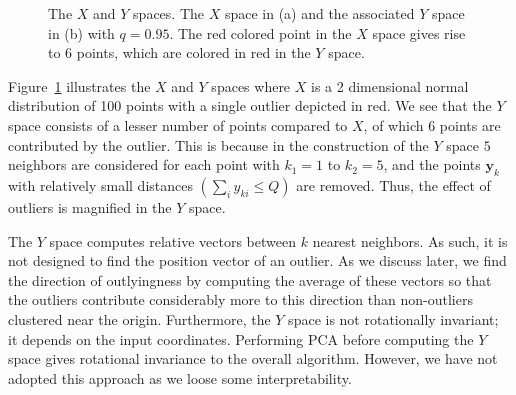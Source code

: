 \documentclass[letter,12pt]{article}
\begin{document}
\begin{figure}[!ht]
	\centering
	\hfill
	\caption{The $X$ and $Y$ spaces. The $X$ space in (a) and the associated $Y$ space in (b) with $q = 0.95$. The red colored point in the $X$ space gives rise to 6 points, which are colored in red in the $Y$ space.}
	\label{fig:XandY}
\end{figure}

Figure~\ref{fig:XandY} illustrates the $X$ and $Y$ spaces where $X$ is a 2 dimensional normal distribution of 100 points with a single outlier depicted in red.  We see that the $Y$ space consists of a lesser number of points compared to $X$, of which 6 points are contributed by the outlier. This is because in the construction of the $Y$ space $5$ neighbors are considered for each point with $k_1=1$ to $k_2=5$, and the points $\bm{y}_k$ with relatively small distances $\left(\sum_i y_{ki} \leq Q\right)$ are removed. Thus, the effect of outliers is magnified in the $Y$ space. 

{\color{blue} The $Y$ space computes relative vectors between $k$ nearest neighbors. As such, it is not designed to find the position vector of an outlier. As we discuss later, we find the direction of outlyingness by computing the average of these vectors so that the outliers contribute considerably more to this direction than non-outliers clustered near the origin.  Furthermore, the $Y$ space is not rotationally invariant; it depends  on the input coordinates. Performing PCA before computing the $Y$ space gives rotational invariance to the overall algorithm. However, we have not adopted this approach as we loose some interpretability.  } %
\end{document}
